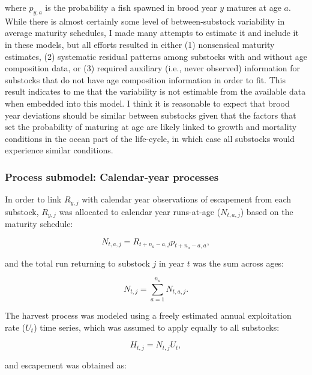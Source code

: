 \documentclass[12pt,]{book}
\theoremstyle{definition}
\theoremstyle{definition}
\theoremstyle{definition}
\theoremstyle{remark}
\begin{document}
\noindent
where \(p_{y,a}\) is the probability a fish spawned in brood year \(y\)
matures at age \(a\). While there is almost certainly some level of
between-substock variability in average maturity schedules, I made many
attempts to estimate it and include it in these models, but all efforts
resulted in either (1) nonsensical maturity estimates, (2) systematic
residual patterns among substocks with and without age composition data,
or (3) required auxiliary (i.e., never observed) information for
substocks that do not have age composition information in order to fit.
This result indicates to me that the variability is not estimable from
the available data when embedded into this model. I think it is
reasonable to expect that brood year deviations should be similar
between substocks given that the factors that set the probability of
maturing at age are likely linked to growth and mortality conditions in
the ocean part of the life-cycle, in which case all substocks would
experience similar conditions.

\subsubsection{Process submodel: Calendar-year
processes}\label{ssm-cproc-model}

\noindent
In order to link \(R_{y,j}\) with calendar year observations of
escapement from each substock, \(R_{y,j}\) was allocated to calendar
year runs-at-age (\(N_{t,a,j}\)) based on the maturity schedule:

\begin{equation}
  N_{t,a,j} = R_{t+n_a-a,j} p_{t+n_a-a,a},
  \label{eq:tsm-get-N-ta}
\end{equation}

\noindent
and the total run returning to substock \(j\) in year \(t\) was the sum
across ages:

\begin{equation}
  N_{t,j}=\sum_{a=1}^{n_a} N_{t,a,j}.
  \label{eq:tsm-get-N}
\end{equation}

\noindent
The harvest process was modeled using a freely estimated annual
exploitation rate (\(U_t\)) time series, which was assumed to apply
equally to all substocks:

\begin{equation}
  H_{t,j}=N_{t,j} U_t,
  \label{eq:tsm-get-H}
\end{equation}

\noindent
and escapement was obtained as:
\end{document}
